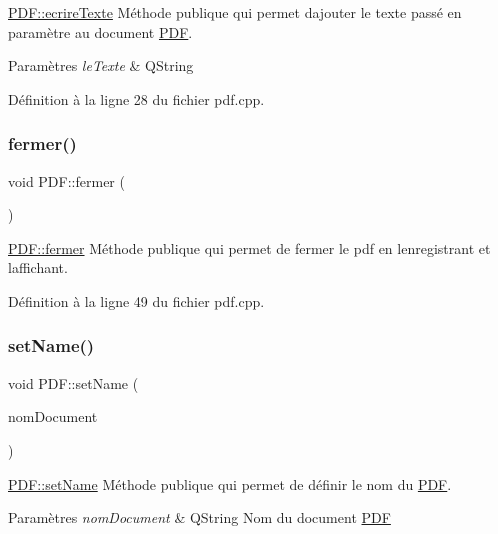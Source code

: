 \hyperlink{class_p_d_f_a7bb38923f4141702b3772ec41213917f}{P\+D\+F\+::ecrire\+Texte} Méthode publique qui permet d\textquotesingle{}ajouter le texte passé en paramètre au document \hyperlink{class_p_d_f}{P\+DF}. 


\begin{DoxyParams}{Paramètres}
{\em le\+Texte} & Q\+String \\
\hline
\end{DoxyParams}


Définition à la ligne 28 du fichier pdf.\+cpp.

\mbox{\label{class_p_d_f_a96a1cc767274d19eedec45ff7aca6b7a}} 
\subsubsection{\texorpdfstring{fermer()}{fermer()}}
{\footnotesize\ttfamily void P\+D\+F\+::fermer (\begin{DoxyParamCaption}{ }\end{DoxyParamCaption})}



\hyperlink{class_p_d_f_a96a1cc767274d19eedec45ff7aca6b7a}{P\+D\+F\+::fermer} Méthode publique qui permet de fermer le pdf en l\textquotesingle{}enregistrant et l\textquotesingle{}affichant. 



Définition à la ligne 49 du fichier pdf.\+cpp.

\mbox{\label{class_p_d_f_a09ab186beccd7afa32dd947532a83e78}} 
\subsubsection{\texorpdfstring{set\+Name()}{setName()}}
{\footnotesize\ttfamily void P\+D\+F\+::set\+Name (\begin{DoxyParamCaption}\item[{Q\+String}]{nom\+Document }\end{DoxyParamCaption})}



\hyperlink{class_p_d_f_a09ab186beccd7afa32dd947532a83e78}{P\+D\+F\+::set\+Name} Méthode publique qui permet de définir le nom du \hyperlink{class_p_d_f}{P\+DF}. 


\begin{DoxyParams}{Paramètres}
{\em nom\+Document} & Q\+String Nom du document \hyperlink{class_p_d_f}{P\+DF} \\
\hline
\end{DoxyParams}


